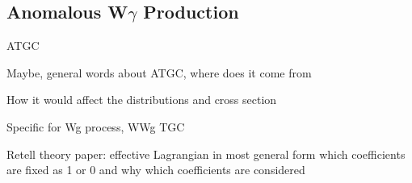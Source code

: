 \subsection{Anomalous W$\gamma$ Production}
ATGC

Maybe, general words about ATGC, where does it come from

How it would affect the distributions and cross section

Specific for Wg process, WWg TGC

Retell theory paper:
effective Lagrangian in most general form
which coefficients are fixed as 1 or 0 and why
which coefficients are considered
